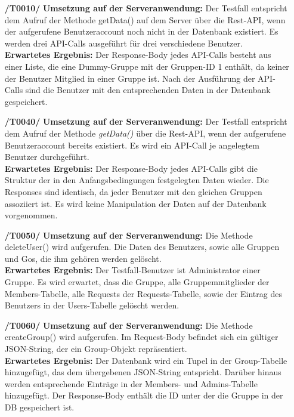 \documentclass[11pt,a4paper]{scrartcl}
\begin{document}
\begin{enumerate}
	\item[\textbf{/T0010/}]
	\textbf{Umsetzung auf der Serveranwendung: }Der Testfall entspricht dem Aufruf der Methode getData() auf dem Server über die Rest-API, wenn der aufgerufene Benutzeraccount noch nicht in der Datenbank existiert. Es werden drei API-Calls ausgeführt für drei verschiedene Benutzer.\\
	\textbf{Erwartetes Ergebnis: } Der Response-Body jedes API-Calls besteht aus einer Liste, die eine Dummy-Gruppe mit der Gruppen-ID 1 enthält, da keiner der Benutzer Mitglied in einer Gruppe ist. Nach der Ausführung der API-Calls sind die Benutzer mit den entsprechenden Daten in der Datenbank gespeichert.
	
	\item[\textbf{/T0040/}]
	\textbf{Umsetzung auf der Serveranwendung: }Der Testfall entspricht dem Aufruf der Methode \textit{getData()} über die Rest-API, wenn der aufgerufene Benutzeraccount bereits existiert. Es wird ein API-Call je angelegtem Benutzer durchgeführt.\\
	\textbf{Erwartetes Ergebnis: }Der Response-Body jedes API-Calls gibt die Struktur der in den Anfangsbedingungen festgelegten Daten wieder. Die Responses sind identisch, da jeder Benutzer mit den gleichen Gruppen assoziiert ist. Es wird keine Manipulation der Daten auf der Datenbank vorgenommen.
	
	\item[\textbf{/T0050/}]
	\textbf{Umsetzung auf der Serveranwendung: }Die Methode deleteUser() wird aufgerufen. Die Daten des Benutzers, sowie alle Gruppen und Gos, die ihm gehören werden gelöscht.\\
	\textbf{Erwartetes Ergebnis: }Der Testfall-Benutzer ist Administrator einer Gruppe. Es wird erwartet, dass die Gruppe, alle Gruppemmitglieder der Members-Tabelle, alle Requests der Requests-Tabelle, sowie der Eintrag des Benutzers in der Users-Tabelle gelöscht werden.
	
	\item[\textbf{/T0060/}]
	\textbf{Umsetzung auf der Serveranwendung: }Die Methode createGroup() wird aufgerufen. Im Request-Body befindet sich ein gültiger JSON-String, der ein Group-Objekt repräsentiert.\\
	\textbf{Erwartetes Ergebnis: }Der Datenbank wird ein Tupel in der Group-Tabelle hinzugefügt, das dem übergebenen JSON-String entspricht. Darüber hinaus werden entsprechende Einträge in der Members- und Admins-Tabelle hinzugefügt. Der Response-Body enthält die ID unter der die Gruppe in der DB gespeichert ist.
	

\end{enumerate}
\end{document}
